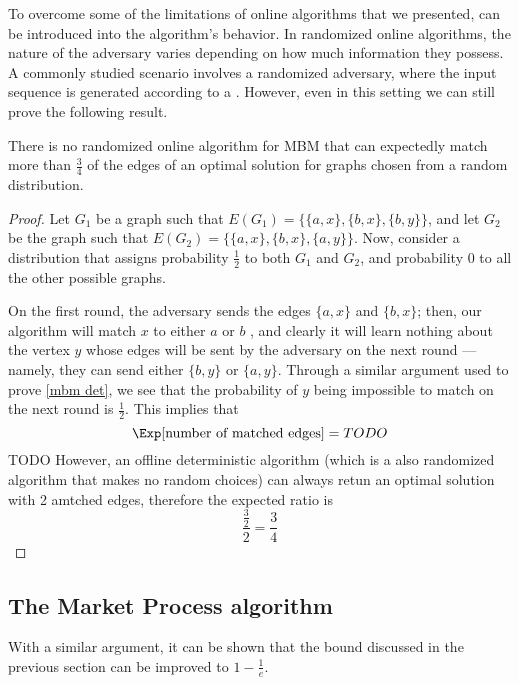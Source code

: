 \documentclass[a4paper, 12pt]{report}
\begin{document}
    To overcome some of the limitations of  online algorithms that we presented,  can be introduced into the algorithm's behavior. In randomized online algorithms, the nature of the adversary varies depending on how much information they possess. A commonly studied scenario involves a randomized adversary, where the input sequence is generated according to a . However, even in this setting we can still prove the following result.
    
    \begin{framedthm}{}
        There is no randomized online algorithm for MBM that can expectedly match more than $\tfrac{3}{4}$ of the edges of an optimal solution for graphs chosen from a random distribution.
    \end{framedthm}

    \begin{proof}
        Let $G_1$ be a graph such that $E(G_1) = \{\{a, x\}, \{b, x\}, \{b, y\}\}$, and let $G_2$ be the graph such that $E(G_2) = \{\{a, x\}, \{b, x\}, \{a, y\}\}$. Now, consider a distribution that assigns probability $\tfrac{1}{2}$ to both $G_1$ and $G_2$, and probability 0 to all the other possible graphs.

        On the first round, the adversary sends the edges $\{a, x\}$ and $\{b, x\}$; then, our algorithm will match $x$ to either $a$ or $b$ , and clearly it will learn nothing about the vertex $y$ whose edges will be sent by the adversary on the next round --- namely, they can send either $\{b, y\}$ or $\{a, y\}$. Through a similar argument used to prove \cref{mbm det}, we see that the probability of $y$ being impossible to match on the next round is $\tfrac{1}{2}$. This implies that $$\Exp[\mbox{number of matched edges}] = TODO$$ TODO  However, an offline deterministic algorithm (which is a also randomized algorithm that makes no random choices) can always retun an optimal solution with 2 amtched edges, therefore the expected ratio is $$\dfrac{\tfrac{3}{2}}{2} = \dfrac{3}{4}$$
    \end{proof}

    \subsection{The Market Process algorithm}

    With a similar argument, it can be shown that the bound discussed in the previous section can be improved to $1 - \tfrac{1}{e}$.
\end{document}
